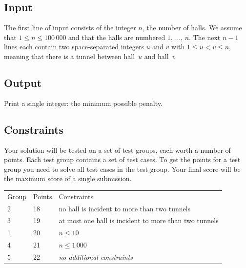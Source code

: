 \subsection*{Input}

The first line of input consists of the integer $n$, the number of halls.
We assume that $1\leq n\leq 100\,000$ and that the halls are numbered $1$, $\ldots$, $n$.
The next $n-1$ lines each contain two space-separated integers $u$ and $v$ with $1\leq u < v \leq n$, meaning that there is a tunnel between hall~$u$ and hall~$v$ 

\subsection*{Output}

Print a single integer: the minimum possible penalty.

\subsection*{Constraints}

Your solution will be tested on a set of test groups, each worth a number of points.
Each test group contains a set of test cases.
To get the points for a test group you need to solve all test cases in the test group.
Your final score will be the maximum score of a single submission.

\begin{tabular}{lll}
Group & Points & Constraints \\
2 & 18 & no hall is incident to more than two tunnels\\
3 & 19 & at most one hall is incident to more than two tunnels\\
1 & 20 & $n\leq 10$\\
4 & 21 & $n\leq 1\,000$\\
5 & 22 & \emph{no additional constraints}
\end{tabular}
